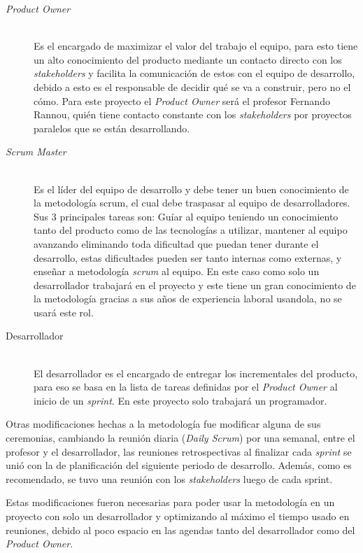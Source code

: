 \begin{description}
  \item[\emph{Product Owner}] \hfill \\
  Es el encargado de maximizar el valor del trabajo el equipo, para esto tiene un alto conocimiento del producto mediante un contacto directo con los \emph{stakeholders} y facilita la comunicación de estos con el equipo de desarrollo, debido a esto es el responsable de decidir qué se va a construir, pero no el cómo. Para este proyecto el \emph{Product Owner} será el profesor Fernando Rannou, quién tiene contacto constante con los \emph{stakeholders} por proyectos paralelos que se están desarrollando.
  \item[\emph{Scrum Master}] \hfill \\
  Es el líder del equipo de desarrollo y debe tener un buen conocimiento de la metodología scrum, el cual debe traspasar al equipo de desarrolladores. Sus 3 principales tareas son: Guíar al equipo teniendo un conocimiento tanto del producto como de las tecnologías a utilizar, mantener al equipo avanzando eliminando toda dificultad que puedan tener durante el desarrollo, estas dificultades pueden ser tanto internas como externas, y enseñar a metodología \emph{scrum} al equipo. En este caso como solo un desarrollador trabajará en el proyecto y este tiene un gran conocimiento de la metodología gracias a sus años de experiencia laboral usandola, no se usará este rol.
  \item[Desarrollador] \hfill \\
  El desarrollador es el encargado de entregar los incrementales del producto, para eso se basa en la lista de tareas definidas por el \emph{Product Owner} al inicio de un \emph{sprint}. En este proyecto solo trabajará un programador.
\end{description}

Otras modificaciones hechas a la metodología fue modificar alguna de sus ceremonias, cambiando la reunión diaria (\emph{Daily Scrum}) por una semanal, entre el profesor y el desarrollador, las reuniones retrospectivas al finalizar cada \emph{sprint} se unió con la de planificación del siguiente periodo de desarrollo. Además, como es recomendado, se tuvo una reunión con los \emph{stakeholders} luego de cada sprint.

Estas modificaciones fueron necesarias para poder usar la metodología en un proyecto con solo un desarrollador y optimizando al máximo el tiempo usado en reuniones, debido al poco espacio en las agendas tanto del desarrollador como del \emph{Product Owner}.

